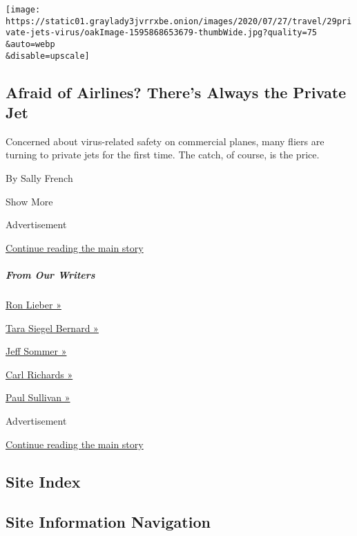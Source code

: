 \begin{enumerate}
  \texttt{[image: https://static01.graylady3jvrrxbe.onion/images/2020/07/27/travel/29private-jets-virus/oakImage-1595868653679-thumbWide.jpg?quality=75\\\&auto=webp\\\&disable=upscale]}

  \hypertarget{afraid-of-airlines-theres-always-the-private-jet}{%
  \subsection{Afraid of Airlines? There's Always the Private
  Jet}\label{afraid-of-airlines-theres-always-the-private-jet}}

  Concerned about virus-related safety on commercial planes, many fliers
  are turning to private jets for the first time. The catch, of course,
  is the price.

  By Sally French
\end{enumerate}

Show More

Advertisement

\protect\hyperlink{after-mid1}{Continue reading the main story}

\hypertarget{from-our-writers}{%
\subparagraph{From Our Writers}\label{from-our-writers}}

\href{https://www.nytimes3xbfgragh.onion/by/ron-lieber}{Ron Lieber »}

\href{https://www.nytimes3xbfgragh.onion/by/tara-siegel-bernard}{Tara
Siegel Bernard »}

\href{https://www.nytimes3xbfgragh.onion/by/jeff-sommer}{Jeff Sommer »}

\href{https://www.nytimes3xbfgragh.onion/by/carl-richards}{Carl Richards
»}

\href{https://www.nytimes3xbfgragh.onion/column/wealth-matters}{Paul
Sullivan »}

Advertisement

\protect\hyperlink{after-mktg}{Continue reading the main story}

\hypertarget{site-index}{%
\subsection{Site Index}\label{site-index}}

\hypertarget{site-information-navigation}{%
\subsection{Site Information
Navigation}\label{site-information-navigation}}

